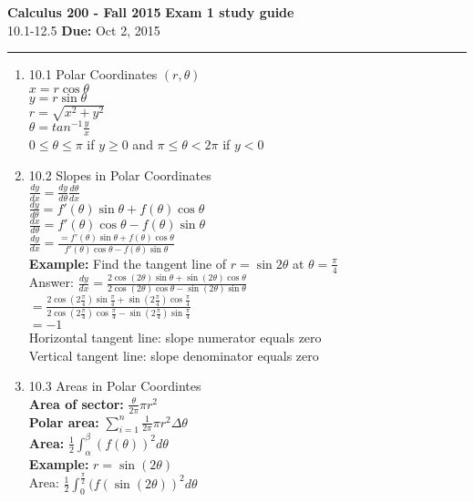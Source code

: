 \documentclass[11pt]{article}
\newcommand{\hwheadings}[3]{
{\bf Calculus 200 -  Fall 2015} \hfill {{\bf Exam 1 study guide}}\\
{{\bf } #2} \hfill {{\bf Due:} #3} \\
\rule[0.1in]{\textwidth}{0.025in}
}
\begin{document}
\hwheadings{4}{10.1-12.5}{Oct 2, 2015}

\begin{enumerate}

\item 10.1 Polar Coordinates $(r,\theta)$
\\
$x=r \cos \theta$
\\
$y=r\sin \theta$
\\
$r=\sqrt{x^2+y^2}$
\\
$\theta= tan^{-1} \frac{y}{x}$
\\
$0 \le \theta \le \pi$ if $y \ge 0 $ and $\pi \le \theta < 2\pi$ if $y < 0$




\item 10.2 Slopes in Polar Coordinates
\\
$\frac{dy}{dx}=\frac{dy}{d\theta} \frac{d\theta}{dx}$
\\
$\frac{dy}{d\theta}=f'(\theta)\sin \theta+ f(\theta) \cos \theta$
\\
$\frac{dx}{d\theta}=f'(\theta)\cos \theta - f(\theta) \sin \theta$
\\
$\frac{dy}{dx}=\frac{=f'(\theta)\sin \theta+ f(\theta) \cos \theta}{f'(\theta)\cos \theta - f(\theta) \sin \theta}$
\\
\textbf{Example:} Find the tangent line of $r=\sin 2 \theta$ at $\theta=\frac{\pi}{4}$
\\
Answer: $\frac{dy}{dx}=\frac{2 \cos(2\theta)\sin \theta + \sin(2\theta)\cos \theta}{2 \cos(2\theta)\cos\theta-\sin(2\theta)\sin\theta}$
\\
$=\frac{2 \cos(2\frac{\pi}{4})\sin \frac{\pi}{4} + \sin(2\frac{\pi}{4})\cos \frac{\pi}{4}}{2 \cos(2\frac{\pi}{4})\cos\frac{\pi}{4}-\sin(2\frac{\pi}{4})\sin\frac{\pi}{4}}$
\\
$=-1$
\\
Horizontal tangent line: slope numerator equals zero
\\
Vertical tangent line: slope denominator equals zero
\\




\item 10.3 Areas in Polar Coordintes
\\
\textbf{Area of sector:} $\frac{\theta}{2\pi} \pi r^2$
\\
\textbf{Polar area:} $\sum \limits_{i=1}^n \frac{1}{2\pi} \pi r^2 \Delta \theta$
\\
\textbf{Area:} $\frac{1}{2} \int_{\alpha}^{\beta}(f(\theta))^2 d\theta$
\\
\textbf{Example:} $r=\sin(2\theta)$
\\
Area: $\frac{1}{2} \int_{0}^{\frac{\pi}{2}}(f(\sin(2\theta))^2 d\theta$



\end{enumerate}
\end{document}
